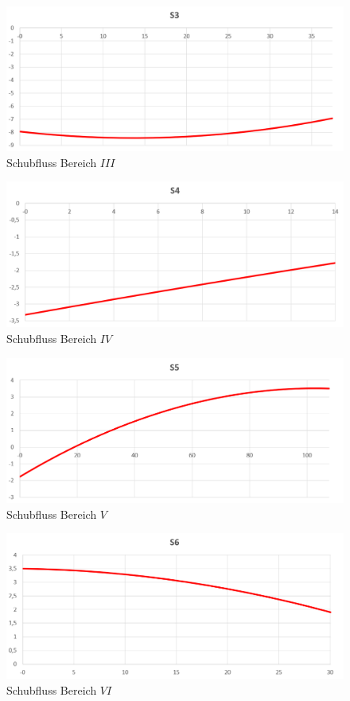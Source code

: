 \begin{figure}
	\includegraphics[width=1.0\textwidth]{Bilder/S3.png}
	\caption{Schubfluss Bereich $III$}
	\label{fig:S3}
\end{figure}
\begin{figure}
	\includegraphics[width=1.0\textwidth]{Bilder/S4.png}
	\caption{Schubfluss Bereich $IV$}
	\label{fig:S4}
\end{figure}
\begin{figure}
	\includegraphics[width=1.0\textwidth]{Bilder/S5.png}
	\caption{Schubfluss Bereich $V$}
	\label{fig:S5}
\end{figure}
\begin{figure}
	\includegraphics[width=1.0\textwidth]{Bilder/S6.png}
	\caption{Schubfluss Bereich $VI$}
	\label{fig:S6}
\end{figure}
